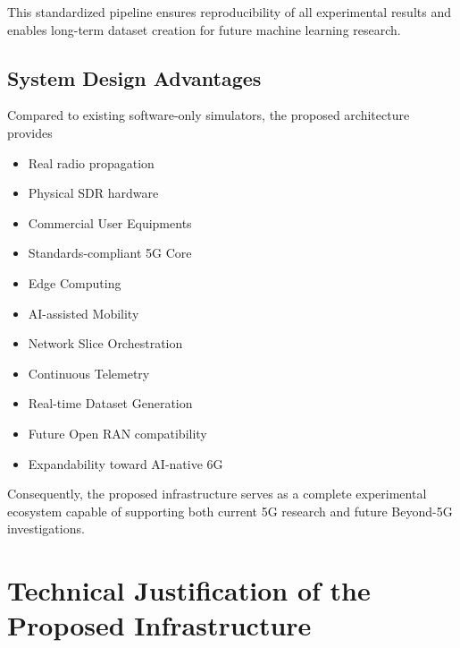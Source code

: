\documentclass[12pt,a4paper]{article}\usepackage[a4paper,margin=1in]{geometry}\usepackage{graphicx}\usepackage{longtable}\usepackage{booktabs}\usepackage{hyperref}\usepackage{enumitem}\usepackage{amsmath}\usepackage{tikz}\usepackage{pgfgantt}\usepackage{setspace}\setstretch{1.15}\usetikzlibrary{positioning,arrows.meta,shapes.geometric}
\begin{document}
	This standardized pipeline ensures reproducibility of all experimental results and enables long-term dataset creation for future machine learning research.
	
	
	\subsection{System Design Advantages}
	
	Compared to existing software-only simulators, the proposed architecture provides
	
	\begin{itemize}
		
		\item Real radio propagation
		
		\item Physical SDR hardware
		
		\item Commercial User Equipments
		
		\item Standards-compliant 5G Core
		
		\item Edge Computing
		
		\item AI-assisted Mobility
		
		\item Network Slice Orchestration
		
		\item Continuous Telemetry
		
		\item Real-time Dataset Generation
		
		\item Future Open RAN compatibility
		
		\item Expandability toward AI-native 6G
		
	\end{itemize}
	
	Consequently, the proposed infrastructure serves as a complete experimental ecosystem capable of supporting both current 5G research and future Beyond-5G investigations.
	
	\newpage
	
	\section{Technical Justification of the Proposed Infrastructure}
	
\end{document}
